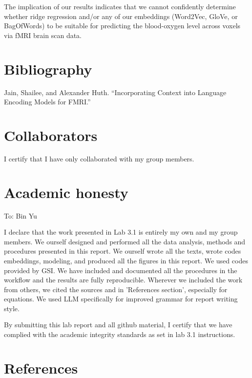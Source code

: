 \documentclass[12pt,letterpaper]{article}
\begin{document}
The implication of our results indicates that we cannot confidently determine whether ridge regression and/or any of our embeddings (Word2Vec, GloVe, or BagOfWords) to be suitable for predicting the blood-oxygen level across voxels via fMRI brain scan data.  


\newpage

\section{Bibliography}

Jain, Shailee, and Alexander Huth. “Incorporating Context into Language Encoding Models for FMRI.” 

\section{Collaborators} 

I certify that I have only collaborated with my group members. 


\section{Academic honesty}
To: Bin Yu 

I declare that the work presented in Lab 3.1 is entirely my own and my group members. We ourself designed and performed all the data analysis, methods and procedures presented in this report. We ourself wrote all the texts, wrote codes embeddings, modeling, and produced all the figures in this report. We used codes provided by GSI. We have included and documented all the procedures in the workflow and the results are fully reproducible. Wherever we included the work from others, we cited the sources and in 'References section', especially for equations. We used LLM specifically for improved grammar for report writing style.

By submitting this lab report and all github material, I certify that we have complied with the academic integrity standards as set in lab 3.1 instructions. 

\section{References}
\end{document}
